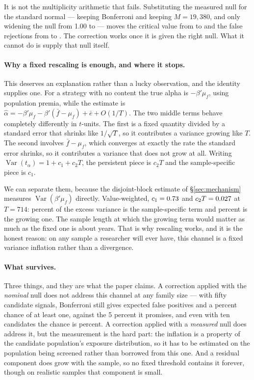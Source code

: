 \documentclass{article}
\begin{document}
It is not the multiplicity arithmetic that fails. Substituting the measured
null for the standard normal --- keeping Bonferroni and keeping
$M = 19{,}380$, and only widening the null from 1.00 to \bzoonullFfSdVw{} ---
moves the critical value from \bzooamBonfCrit{} to \bzooamMeasuredBonfCrit{}
and the false rejections from \bzooamBonfFalseAlpha{} to
\bzooamMeasuredBonfFalse{}. The correction works once it is given the right
null. What it cannot do is supply that null itself.

\paragraph{Why a fixed rescaling is enough, and where it stops.}
This deserves an explanation rather than a lucky observation, and the identity
supplies one. For a strategy with no content the true alpha is
$-\beta'\mu_f$, using population premia, while the estimate is
$\hat\alpha = -\beta'\mu_f - \beta'(\bar f - \mu_f) + \bar e + O(1/T)$. The two
middle terms behave completely differently in $t$-units. The first is a fixed
quantity divided by a standard error that shrinks like $1/\sqrt{T}$, so it
contributes a variance growing like $T$. The second involves $\bar f - \mu_f$,
which converges at exactly the rate the standard error shrinks, so it
contributes a variance that does not grow at all. Writing
$\operatorname{Var}(t_\alpha) = 1 + c_1 + c_2 T$, the persistent piece is
$c_2 T$ and the sample-specific piece is $c_1$.

We can separate them, because the disjoint-block estimate of
\S\ref{sec:mechanism} measures $\operatorname{Var}(\beta'\mu_f)$ directly.
Value-weighted, $c_1 = 0.73$ and $c_2 T = 0.027$ at
$T = 714$: \bzooamCOneSharePct{} percent of the excess variance is the
sample-specific term and \bzooamCTwoSharePct{} percent is the growing one. The
sample length at which the growing term would matter as much as the fixed one
is about \bzooamTEqualYears{} years. That is why rescaling works, and it is the
honest reason: on any sample a researcher will ever have, this channel is a
fixed variance inflation rather than a divergence.

\paragraph{What survives.} Three things, and they are what the paper claims.
A correction applied with the \emph{nominal} null does not address this channel
at any family size --- with fifty candidate signals, Bonferroni still gives
\bzooamFamFiftyBonf{} expected false positives and a
\bzooamFamFiftyAnyPct{} percent chance of at least one, against the 5 percent
it promises, and even with ten candidates the chance is
\bzooamFamTenAnyPct{} percent. A correction applied with a \emph{measured}
null does address it, but the measurement is the hard part: the inflation is a
property of the candidate population's exposure distribution, so it has to be
estimated on the population being screened rather than borrowed from this one.
And a residual component does grow with the sample, so no fixed threshold
contains it forever, though on realistic samples that component is small.
\end{document}
